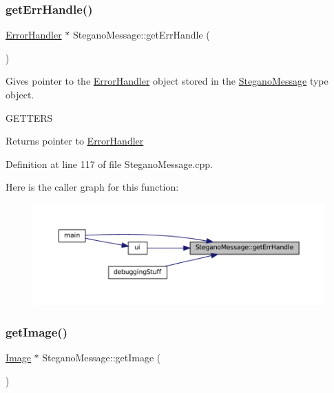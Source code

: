 \subsubsection{\texorpdfstring{getErrHandle()}{getErrHandle()}}
{\footnotesize\ttfamily \mbox{\hyperlink{classErrorHandler}{Error\+Handler}} $\ast$ Stegano\+Message\+::get\+Err\+Handle (\begin{DoxyParamCaption}{ }\end{DoxyParamCaption})}



Gives pointer to the \mbox{\hyperlink{classErrorHandler}{Error\+Handler}} object stored in the \mbox{\hyperlink{classSteganoMessage}{Stegano\+Message}} type object. 

G\+E\+T\+T\+E\+RS\begin{DoxyReturn}{Returns}
pointer to \mbox{\hyperlink{classErrorHandler}{Error\+Handler}} 
\end{DoxyReturn}


Definition at line 117 of file Stegano\+Message.\+cpp.

Here is the caller graph for this function\+:\nopagebreak
\begin{figure}[H]
\begin{center}
\leavevmode
\includegraphics[width=350pt]{classSteganoMessage_a0134757a8c79caa9dca9bcce0686d1ef_icgraph}
\end{center}
\end{figure}
\mbox{\label{classSteganoMessage_a2e3ad705a0219edfd2150f3f7931979c}} 
\subsubsection{\texorpdfstring{getImage()}{getImage()}}
{\footnotesize\ttfamily \mbox{\hyperlink{classImage}{Image}} $\ast$ Stegano\+Message\+::get\+Image (\begin{DoxyParamCaption}{ }\end{DoxyParamCaption})}



